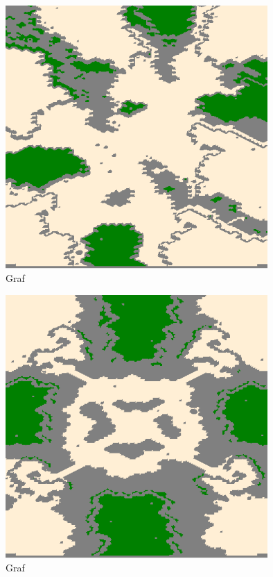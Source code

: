 \begin{figure}[H]
\centering
\includegraphics[width=10cm]{./img/Aftershock.png}
\caption{Graf }
\label{fig:aftershock_map}
\end{figure}

\begin{figure}[H]
\centering
\includegraphics[width=10cm]{./img/Brushfire.png}
\caption{Graf }
\label{fig:brushfire_map}
\end{figure}

